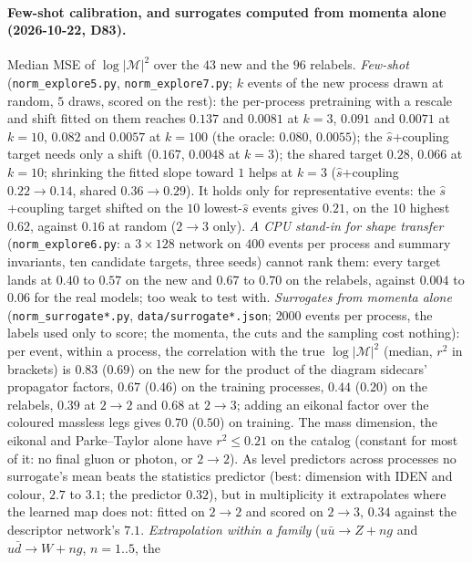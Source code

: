 \documentclass[11pt]{article}
\newcommand{\code}[1]{\texttt{#1}}
\begin{document}
\paragraph{Few-shot calibration, and surrogates computed from momenta alone (2026-10-22, D83).} Median MSE of
$\log|\mathcal M|^2$ over the $43$ new and the $96$ relabels. \emph{Few-shot} (\code{norm\_explore5.py},
\code{norm\_explore7.py}; $k$ events of the new process drawn at random, $5$ draws, scored on the rest): the per-process pretraining with a
rescale and shift fitted on them reaches $0.137$ and $0.0081$ at $k=3$, $0.091$ and $0.0071$ at $k=10$, $0.082$ and
$0.0057$ at $k=100$ (the oracle: $0.080$, $0.0055$); the $\hat s$+coupling target needs only a shift ($0.167$, $0.0048$ at $k=3$); the shared target $0.28$, $0.066$
at $k=10$; shrinking the fitted slope toward $1$ helps at $k=3$ ($\hat s$+coupling $0.22\to0.14$, shared
$0.36\to0.29$). It holds only for representative events: the $\hat s$+coupling target shifted on the $10$ lowest-$\hat s$ events gives $0.21$, on the $10$ highest $0.62$, against
$0.16$ at random ($2\to3$ only). \emph{A CPU stand-in for shape transfer} (\code{norm\_explore6.py}: a $3\times128$
network on $400$ events per process and summary invariants, ten candidate targets, three seeds) cannot rank them: every
target lands at $0.40$ to $0.57$ on the new and $0.67$ to $0.70$ on the relabels, against $0.004$ to $0.06$ for the real
models; too weak to test with. \emph{Surrogates from momenta alone} (\code{norm\_surrogate*.py}, \code{data/surrogate*.json};
$2000$ events per process, the labels used only to score; the momenta, the cuts and the sampling cost nothing): per
event, within a process, the correlation with the true $\log|\mathcal M|^2$ (median, $r^2$ in brackets) is $0.83$
($0.69$) on the new for the product of the diagram sidecars' propagator factors, $0.67$ ($0.46$) on the training
processes, $0.44$ ($0.20$) on the relabels, $0.39$ at $2\to2$ and $0.68$ at $2\to3$; adding an eikonal factor over the
coloured massless legs gives $0.70$ ($0.50$) on training. The mass dimension, the eikonal and Parke--Taylor alone have
$r^2\le0.21$ on the catalog (constant for most of it: no final gluon or photon, or $2\to2$). As level predictors across
processes no surrogate's mean beats the statistics predictor (best: dimension with IDEN and colour, $2.7$ to $3.1$;
the predictor $0.32$), but in
multiplicity it extrapolates where the learned map does not: fitted on $2\to2$ and scored on $2\to3$, $0.34$ against the
descriptor network's $7.1$. \emph{Extrapolation within a family} ($u\bar u\to Z+ng$ and $u\bar d\to W+ng$, $n=1..5$, the
\end{document}

